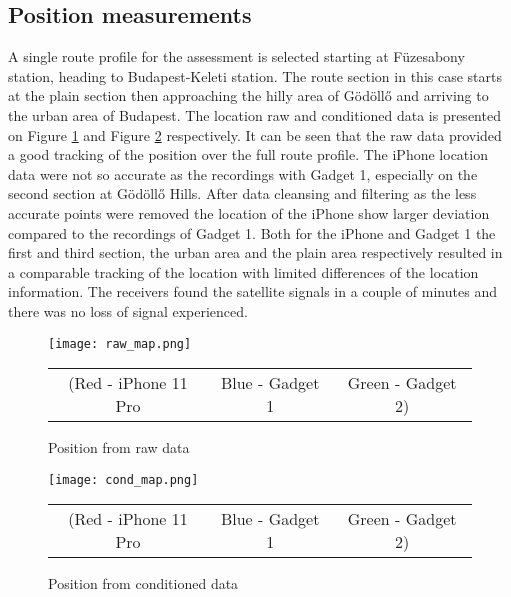 \documentclass{article}
\begin{document}
		\subsection{Position measurements}
			A single route profile for the assessment is selected starting at Füzesabony station, heading to Budapest-Keleti station. The route section in this case starts at the plain section then approaching the hilly area of Gödöllő and arriving to the urban area of Budapest. The location raw and conditioned data is presented on Figure \ref{fig:raw_map} and Figure \ref{fig:cond_map} respectively. It can be seen that the raw data provided a good tracking of the position over the full route profile. The iPhone location data were not so accurate as the recordings with Gadget 1, especially on the second section at Gödöllő Hills. After data cleansing and filtering as the less accurate points were removed the location of the iPhone show larger deviation compared to the recordings of Gadget 1. Both for the iPhone and Gadget 1 the first and third section, the urban area and the plain area respectively resulted in a comparable tracking of the location with limited differences of the location information. The receivers found the satellite signals in a couple of minutes and there was no loss of signal experienced.
			\begin{figure}[h]
				\centering
		      \texttt{[image: raw\_map.png]}
		      \caption{Position from raw data}
		      \begin{tabular}{c c c}
			   		\footnotesize (Red - iPhone 11 Pro & \footnotesize Blue - Gadget 1 & \footnotesize Green - Gadget 2)
		      \end{tabular} 
		      \label{fig:raw_map}
			\end{figure}
			\begin{figure}[h]
				\centering
		   		\texttt{[image: cond\_map.png]}
		   		\caption{Position from conditioned data}
		   		\begin{tabular}{c c c}
					\footnotesize (Red - iPhone 11 Pro & \footnotesize Blue - Gadget 1 & \footnotesize Green - Gadget 2)
		      \end{tabular} 
		      \label{fig:cond_map}
			\end{figure}
\end{document}
